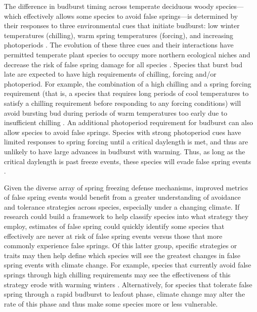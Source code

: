 \documentclass{article}\usepackage[]{graphicx}\usepackage[]{color}
\begin{document}
The difference in budburst timing across temperate deciduous woody species---which effectively allows some species to avoid false springs---is determined by their responses to three environmental cues that initiate budburst: low winter temperatures (chilling), warm spring temperatures (forcing), and increasing photoperiods \citep{Chuine2010}. The evolution of these three cues and their interactions have permitted temperate plant species to occupy more northern ecological niches \citep{Kollas2014} and decrease the risk of false spring damage for all species \citep{Charrier2011}. Species that burst bud late are expected to have high requirements of chilling, forcing and/or photoperiod. For example, the combination of a high chilling and a spring forcing requirement (that is, a species that requires long periods of cool temperatures to satisfy a chilling requirement before responding to any forcing conditions) will avoid bursting bud during periods of warm temperatures too early due to insufficient chilling \citep{Basler2012}. An additional photoperiod requirement for budburst can also allow species to avoid false springs. Species with strong photoperiod cues have limited responses to spring forcing until a critical daylength is met, and thus are unlikely to have large advances in budburst with warming. Thus, as long as the critical daylength is past freeze events, these species will evade false spring events \citep{Basler2014}. 

Given the diverse array of spring freezing defense mechanisms, improved metrics of false spring events would benefit from a greater understanding of avoidance and tolerance strategies across species, especially under a changing climate. If research could build a framework to help classify species into what strategy they employ, estimates of false spring could quickly identify some species that effectively are never at risk of false spring events versus those that more commonly experience false springs. Of this latter group, specific strategies or traits may then help define which species will see the greatest changes in false spring events with climate change. For example, species that currently avoid false springs through high chilling requirements may see the effectiveness of this strategy erode with warming winters \citep{Montwe2018}. Alternatively, for species that tolerate false spring through a rapid budburst to leafout phase, climate change may alter the rate of this phase and thus make some species more or less vulnerable. 
\end{document}
